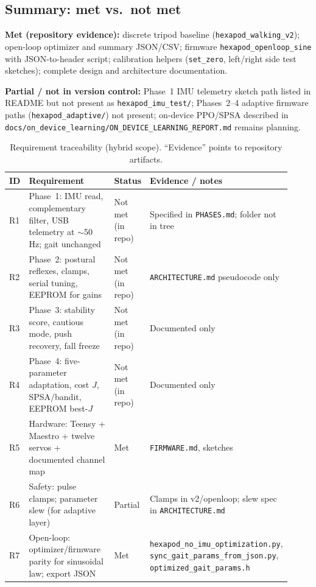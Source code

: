\documentclass[11pt]{article}
\begin{document}
\subsection{Summary: met vs.\ not met}
\textbf{Met (repository evidence):} discrete tripod baseline (\texttt{hexapod\_walking\_v2}); open-loop optimizer and summary JSON/CSV; firmware \texttt{hexapod\_openloop\_sine} with JSON-to-header script; calibration helpers (\texttt{set\_zero}, left/right side test sketches); complete design and architecture documentation.

\textbf{Partial / not in version control:} Phase~1 IMU telemetry sketch path listed in README but not present as \texttt{hexapod\_imu\_test/}; Phases~2--4 adaptive firmware paths (\texttt{hexapod\_adaptive/}) not present; on-device PPO/SPSA described in \texttt{docs/on\_device\_learning/ON\_DEVICE\_LEARNING\_REPORT.md} remains planning.

\begin{table}[htbp]
  \centering
  \caption{Requirement traceability (hybrid scope). ``Evidence'' points to repository artifacts.}
  \label{tab:req}
  \begin{tabular}{@{}p{0.06\linewidth}p{0.36\linewidth}p{0.12\linewidth}p{0.38\linewidth}@{}}
    \toprule
    ID & Requirement & Status & Evidence / notes \\
    \midrule
    R1 & Phase~1: IMU read, complementary filter, USB telemetry at $\sim$50\,Hz; gait unchanged & Not met (in repo) & Specified in \texttt{PHASES.md}; folder not in tree \\
    R2 & Phase~2: postural reflexes, clamps, serial tuning, EEPROM for gains & Not met (in repo) & \texttt{ARCHITECTURE.md} pseudocode only \\
    R3 & Phase~3: stability score, cautious mode, push recovery, fall freeze & Not met (in repo) & Documented only \\
    R4 & Phase~4: five-parameter adaptation, cost $J$, SPSA/bandit, EEPROM best-$J$ & Not met (in repo) & Documented only \\
    R5 & Hardware: Teensy + Maestro + twelve servos + documented channel map & Met & \texttt{FIRMWARE.md}, sketches \\
    R6 & Safety: pulse clamps; parameter slew (for adaptive layer) & Partial & Clamps in v2/openloop; slew spec in \texttt{ARCHITECTURE.md} \\
    R7 & Open-loop: optimizer/firmware parity for sinusoidal law; export JSON & Met & \texttt{hexapod\_no\_imu\_optimization.py}, \texttt{sync\_gait\_params\_from\_json.py}, \texttt{optimized\_gait\_params.h} \\
    \bottomrule
  \end{tabular}
\end{table}
\end{document}
